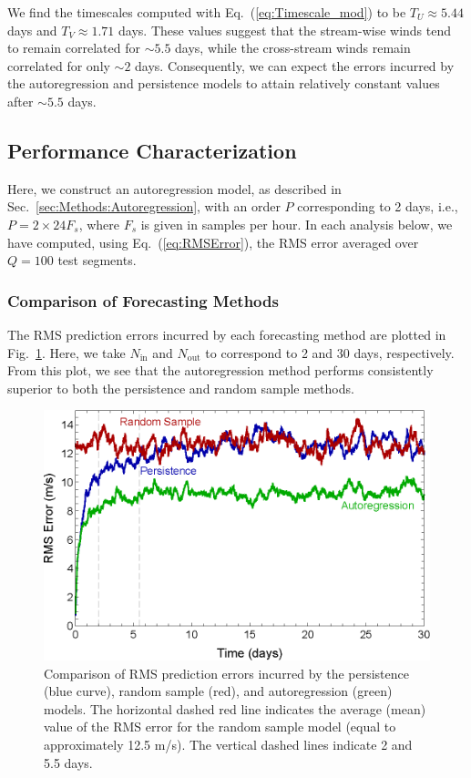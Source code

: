 \documentclass[11pt, oneside]{article}
\newcommand{\figref}[1]{Fig.~\ref{#1}}
\newcommand{\eqnref}[1]{Eq.~(\ref{#1})}
\newcommand{\secref}[1]{Sec.~\ref{#1}}
\begin{document}
We find the timescales computed with \eqnref{eq:Timescale_mod} to be $T_U \approx 5.44$ days and $T_V \approx 1.71$ days.
These values suggest that the stream-wise winds tend to remain correlated for $\sim 5.5$ days, while the cross-stream winds remain correlated for only $\sim 2$ days.
Consequently, we can expect the errors incurred by the autoregression and persistence models to attain relatively constant values after $\sim 5.5$ days. %

\subsection{Performance Characterization}
Here, we construct an autoregression model, as described in \secref{sec:Methods:Autoregression}, with an order $P$ corresponding to 2 days, i.e., $P = 2 \times 24 F_s$, where $F_s$ is given in samples per hour.
In each analysis below, we have computed, using \eqnref{eq:RMSError}, the RMS error averaged over $Q = 100$ test segments.

\subsubsection{Comparison of Forecasting Methods}\label{sec:Results:Comparison}
The RMS prediction errors incurred by each forecasting method are plotted in \figref{fig:ComparisonRMS}.
Here, we take $N_\text{in}$ and $N_\text{out}$ to correspond to 2 and 30 days, respectively.
From this plot, we see that the autoregression method performs consistently superior to both the persistence and random sample methods.

\begin{figure}[htb]
\centering
\includegraphics[width=0.7\columnwidth]{figures/ComparisonRMSPredictionError}
\caption{Comparison of RMS prediction errors incurred by the persistence (blue curve), random sample (red), and autoregression (green) models.
The horizontal dashed red line indicates the average (mean) value of the RMS error for the random sample model (equal to approximately 12.5 m/s).
The vertical dashed lines indicate 2 and 5.5 days.}
\label{fig:ComparisonRMS}
\end{figure}
\end{document}
